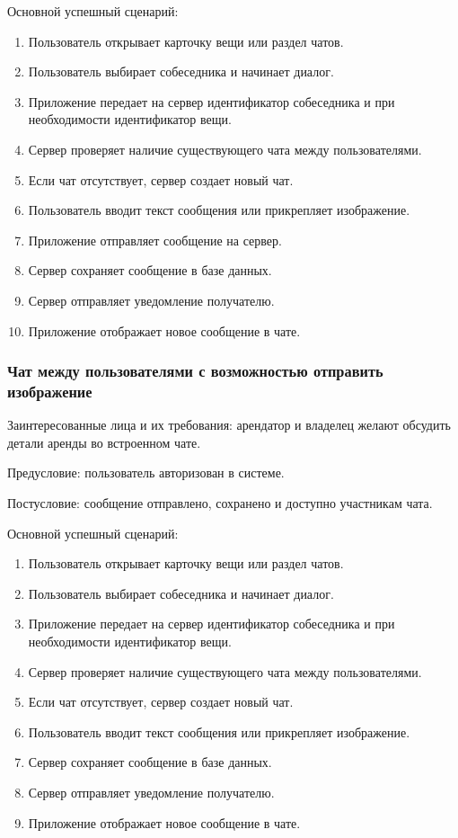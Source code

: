 Основной успешный сценарий:
\begin{enumerate}
    \item Пользователь открывает карточку вещи или раздел чатов.
    \item Пользователь выбирает собеседника и начинает диалог.
    \item Приложение передает на сервер идентификатор собеседника и при необходимости идентификатор вещи.
    \item Сервер проверяет наличие существующего чата между пользователями.
    \item Если чат отсутствует, сервер создает новый чат.
    \item Пользователь вводит текст сообщения или прикрепляет изображение.
    \item Приложение отправляет сообщение на сервер.
    \item Сервер сохраняет сообщение в базе данных.
    \item Сервер отправляет уведомление получателю.
    \item Приложение отображает новое сообщение в чате.
\end{enumerate}

\subsubsection{Чат между пользователями с возможностью отправить изображение}

Заинтересованные лица и их требования: арендатор и владелец желают обсудить детали аренды во встроенном чате.

Предусловие: пользователь авторизован в системе.

Постусловие: сообщение отправлено, сохранено и доступно участникам чата.

Основной успешный сценарий:
\begin{enumerate}
    \item Пользователь открывает карточку вещи или раздел чатов.
    \item Пользователь выбирает собеседника и начинает диалог.
    \item Приложение передает на сервер идентификатор собеседника и при необходимости идентификатор вещи.
    \item Сервер проверяет наличие существующего чата между пользователями.
    \item Если чат отсутствует, сервер создает новый чат.
    \item Пользователь вводит текст сообщения или прикрепляет изображение.
    \item Сервер сохраняет сообщение в базе данных.
    \item Сервер отправляет уведомление получателю.
    \item Приложение отображает новое сообщение в чате.
\end{enumerate}

